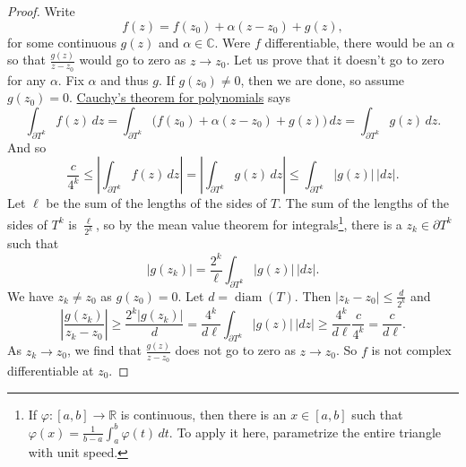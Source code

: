 \documentclass[12pt,openany]{book}
\newcommand{\sabs}[1]{\lvert {#1} \rvert}
\newcommand{\abs}[1]{\left\lvert {#1} \right\rvert}
\newcommand{\C}{{\mathbb{C}}}
\newcommand{\R}{{\mathbb{R}}}
\theoremstyle{plain}
\theoremstyle{remark}
\theoremstyle{definition}
\theoremstyle{exercise}
\theoremstyle{example}
\begin{document}
\begin{proof}
Write
\begin{equation*}
f(z) = f(z_0) + \alpha (z-z_0) + g(z) ,
\end{equation*}
for some continuous $g(z)$ and $\alpha \in \C$.
Were $f$ differentiable, there would be an $\alpha$ so that
$\frac{g(z)}{z-z_0}$ would go to zero as $z \to z_0$.
Let us prove that it doesn't go to zero for any $\alpha$.  Fix $\alpha$
and thus $g$.  If $g(z_0) \not= 0$,
then we are done, so assume $g(z_0) = 0$.
\hyperref[cor:cauchyforpoly]{Cauchy's theorem for polynomials} says
\begin{equation*}
\int_{\partial T^k} f(z) \, dz =
\int_{\partial T^k} \bigl( f(z_0) + \alpha (z-z_0) + g(z) \bigr) \, dz =
\int_{\partial T^k} g(z) \, dz .
\end{equation*}
And so
\begin{equation*}
\frac{c}{4^k} \leq
\abs{
\int_{\partial T^k} f(z) \, dz
} =
\abs{
\int_{\partial T^k} g(z) \, dz 
}
\leq
\int_{\partial T^k} \sabs{g(z)} \, \sabs{dz} .
\end{equation*}
Let $\ell$ be the sum of the lengths of the sides of $T$.
The sum of the lengths of the sides of $T^k$ is
$\frac{\ell}{2^k}$, so
by the mean value theorem for integrals\footnote{%
If $\varphi \colon [a,b] \to \R$ is continuous, then there is an $x \in [a,b]$
such that $\varphi(x) = \frac{1}{b-a} \int_a^b \varphi(t) \, dt$.
To apply it here, parametrize the entire triangle with unit speed.},
there is a $z_k \in \partial T^k$ such that
\begin{equation*}
\sabs{g(z_k)} = 
\frac{2^k}{\ell}
\int_{\partial T^k} \sabs{g(z)} \, \sabs{dz} .
\end{equation*}
We have $z_k \not= z_0$ as $g(z_0)=0$.
Let $d = \operatorname{diam}(T)$.  Then
$\sabs{z_k-z_0} \leq \frac{d}{2^k}$ and
\begin{equation*}
\abs{\frac{g(z_k)}{z_k-z_0}}
\geq
\frac{2^k\sabs{g(z_k)}}{d}
=
\frac{4^k}{d \ell}
\int_{\partial T^k} \sabs{g(z)} \, \sabs{dz}
\geq
\frac{4^k}{d \ell}
\frac{c}{4^k} = \frac{c}{d \ell} .
\end{equation*}
As $z_k \to z_0$, we find that $\frac{g(z)}{z-z_0}$ does not 
go to zero as $z \to z_0$.  So $f$ is not complex differentiable at $z_0$.
\end{proof}
\end{document}
